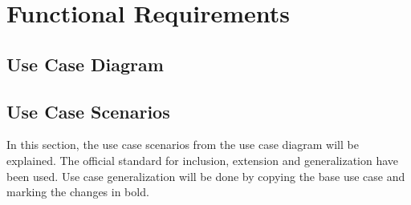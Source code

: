 \section{Functional Requirements}
\subsection{Use Case Diagram}
\subsection{Use Case Scenarios}
In this section, the use case scenarios from the use case diagram will be explained. The official standard for inclusion, extension and 
generalization have been used. Use case generalization will be done by copying the base use case and marking the changes in bold.
















